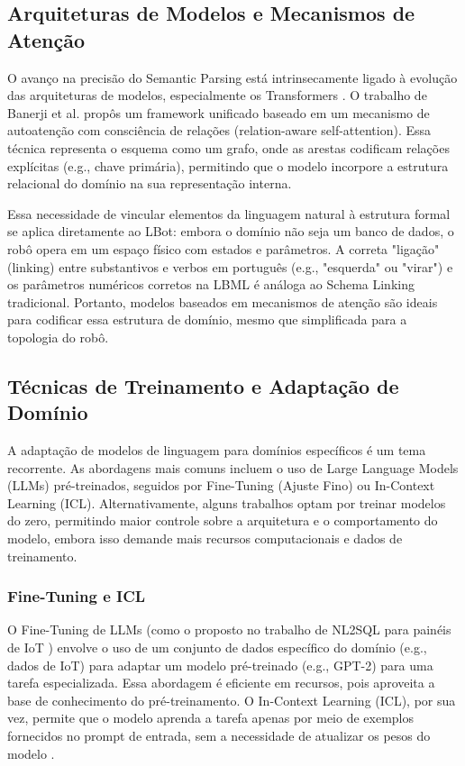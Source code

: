\documentclass[12pt]{article}
\begin{document}
\subsection{Arquiteturas de Modelos e Mecanismos de Atenção}

O avanço na precisão do Semantic Parsing está intrinsecamente ligado à evolução das arquiteturas de modelos, especialmente os Transformers \citep{Wang2021,Banerji2025}. O trabalho de Banerji et al. \citep{Banerji2025} propôs um framework unificado baseado em um mecanismo de autoatenção com consciência de relações (relation-aware self-attention). Essa técnica representa o esquema como um grafo, onde as arestas codificam relações explícitas (e.g., chave primária), permitindo que o modelo incorpore a estrutura relacional do domínio na sua representação interna.

Essa necessidade de vincular elementos da linguagem natural à estrutura formal se aplica diretamente ao LBot: embora o domínio não seja um banco de dados, o robô opera em um espaço físico com estados e parâmetros. A correta "ligação" (linking) entre substantivos e verbos em português (e.g., "esquerda" ou "virar") e os parâmetros numéricos corretos na LBML é análoga ao Schema Linking tradicional. Portanto, modelos baseados em mecanismos de atenção são ideais para codificar essa estrutura de domínio, mesmo que simplificada para a topologia do robô.

\subsection{Técnicas de Treinamento e Adaptação de Domínio}

A adaptação de modelos de linguagem para domínios específicos é um tema recorrente. As abordagens mais comuns incluem o uso de Large Language Models (LLMs) pré-treinados, seguidos por Fine-Tuning (Ajuste Fino) ou In-Context Learning (ICL). Alternativamente, alguns trabalhos optam por treinar modelos do zero, permitindo maior controle sobre a arquitetura e o comportamento do modelo, embora isso demande mais recursos computacionais e dados de treinamento.

\subsubsection{Fine-Tuning e ICL}

O Fine-Tuning de LLMs (como o proposto no trabalho de NL2SQL para painéis de IoT \citep{Banerji2025}) envolve o uso de um conjunto de dados específico do domínio (e.g., dados de IoT) para adaptar um modelo pré-treinado (e.g., GPT-2) para uma tarefa especializada. Essa abordagem é eficiente em recursos, pois aproveita a base de conhecimento do pré-treinamento. O In-Context Learning (ICL), por sua vez, permite que o modelo aprenda a tarefa apenas por meio de exemplos fornecidos no prompt de entrada, sem a necessidade de atualizar os pesos do modelo \citep{Wu2025}.
\end{document}
